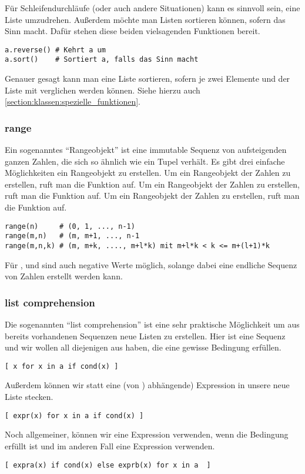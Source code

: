 Für Schleifendurchläufe (oder auch andere Situationen) kann es sinnvoll sein, eine Liste umzudrehen.
Außerdem möchte man Listen sortieren können, sofern das Sinn macht.
Dafür stehen diese beiden vielsagenden Funktionen bereit.
\begin{lstlisting}
a.reverse() # Kehrt a um
a.sort()    # Sortiert a, falls das Sinn macht
\end{lstlisting}
Genauer gesagt kann man eine Liste sortieren, sofern je zwei Elemente  und  der Liste mit  verglichen werden können.
Siehe hierzu auch \ref{section:klassen:spezielle_funktionen}.


\subsubsection{range}
\label{section:std_data_types:sequenzen:range}
Ein sogenanntes ``Rangeobjekt'' ist eine immutable Sequenz von aufsteigenden ganzen Zahlen, die sich so ähnlich wie ein Tupel verhält.
Es gibt drei einfache Möglichkeiten ein Rangeobjekt zu erstellen.
Um ein Rangeobjekt der Zahlen  zu erstellen, ruft man die Funktion  auf.
Um ein Rangeobjekt der Zahlen  zu erstellen, ruft man die Funktion  auf.
Um ein Rangeobjekt der Zahlen  zu erstellen, ruft man die Funktion  auf.
\begin{lstlisting}
range(n)     # (0, 1, ..., n-1)
range(m,n)   # (m, m+1, ..., n-1
range(m,n,k) # (m, m+k, ...., m+l*k) mit m+l*k < k <= m+(l+1)*k
\end{lstlisting}
Für ,  und  sind auch negative Werte möglich, solange dabei eine endliche Sequenz von Zahlen erstellt werden kann.


\subsubsection{list comprehension}
\label{section:std_data_types:sequenzen:list_comprehension}
Die sogenannten ``list comprehension'' ist eine sehr praktische Möglichkeit um aus bereits vorhandenen Sequenzen neue Listen zu erstellen.
Hier ist  eine Sequenz und wir wollen all diejenigen  aus  haben, die eine gewisse Bedingung  erfüllen.
\begin{lstlisting}
[ x for x in a if cond(x) ]
\end{lstlisting}
Außerdem können wir statt  eine (von ) abhängende) Expression  in unsere neue Liste stecken.
\begin{lstlisting}
[ expr(x) for x in a if cond(x) ]
\end{lstlisting}
Noch allgemeiner, können wir eine Expression  verwenden, wenn die Bedingung  erfüllt ist und im anderen Fall eine Expression  verwenden.
\begin{lstlisting}
[ expra(x) if cond(x) else exprb(x) for x in a  ]
\end{lstlisting}

